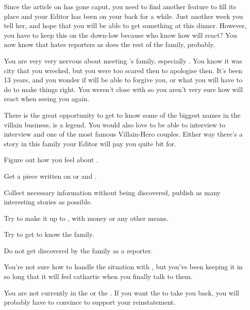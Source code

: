 \documentclass[char]{LRSguildcamp1}
\begin{document}
Since the article on \cYoungest{} has gone caput, you need to find another feature to fill its place and your Editor has been on your back for a while. Just another week you tell her, and hope that you will be able to get something at this dinner. However, you have to keep this on the down-low because who know how \cYoungest{} will react? You now know that \cYoungest{} hates reporters as does the rest of the family, probably. 

You are very very nervous about meeting \cYoungest{}'s family, especially \cOS{}. You know it was \cOS{} city that you wrecked, but you were too scared then to apologise then. It's been 13 years, and you wonder if \cOS{} will be able to forgive you, or what you will have to do to make things right. You weren't close with \cOS{} so you aren't very sure how \cOS{\they} will react when seeing you again. 

There is the great opportunity to get to know some of the biggest names in the villain business, \cGrandma{} is a legend. You would also love to be able to interview to interview \cOldest{} and \cOS{} one of the most famous Villain-Hero couples. Either way there's a story in this family your Editor will pay you quite bit for. 


\begin{itemz}[Goals]
	\item Figure out how you feel about \cYoungest{}. 
	\item Get a piece written on \cGrandma{} or \cOldest{} and \cOS{}. 
	\item Collect necessary information without being discovered, publish as many interesting stories as possible.
	\item Try to make it up to \cOS{}, with money or any other means.
	\item Try to get to know the family. 
	\item Do not get discovered by the family as a reporter. 
\end{itemz}

\begin{itemz}[Notes]
	\item You're not sure how to handle the situation with \cOS{}, but you've been keeping it in so long that it will feel cathartic when you finally talk to them. 
	\item You are not currently in the \cHeroLeague{\intro} or the \cVillainCompact{\intro}.  If you want the \cHeroLeague{} to take you back, you will probably have to convince \cYoungest{} to support your reinstatement.
\end{itemz}
\end{document}
